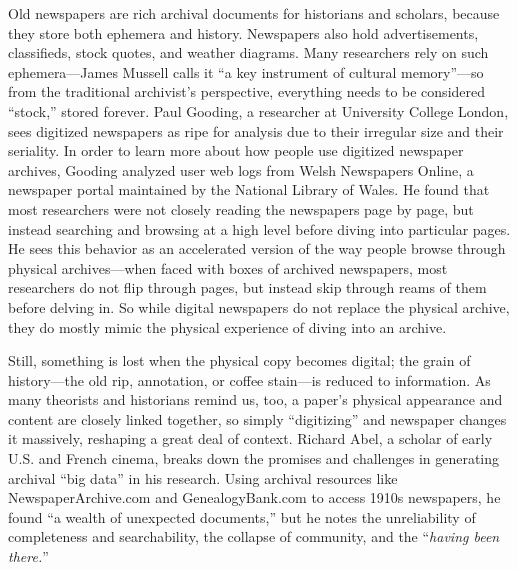Old newspapers are rich archival documents for historians and scholars, because they store both ephemera and history. Newspapers also hold advertisements, classifieds, stock quotes, and weather diagrams. Many researchers rely on such ephemera---James Mussell calls it ``a key instrument of cultural memory''---so from the traditional archivist's perspective, everything needs to be considered ``stock,'' stored forever.\autocite{mussell_passing_2012} Paul Gooding, a researcher at University College London, sees digitized newspapers as ripe for analysis due to their irregular size and their seriality.\autocite{gooding_exploring_2014} In order to learn more about how people use digitized newspaper archives, Gooding analyzed user web logs from Welsh Newspapers Online, a newspaper portal maintained by the National Library of Wales. He found that most researchers were not closely reading the newspapers page by page, but instead searching and browsing at a high level before diving into particular pages. He sees this behavior as an accelerated version of the way people browse through physical archives---when faced with boxes of archived newspapers, most researchers do not flip through pages, but instead skip through reams of them before delving in. So while digital newspapers do not replace the physical archive, they do mostly mimic the physical experience of diving into an archive.

Still, something is lost when the physical copy becomes digital; the grain of history---the old rip, annotation, or coffee stain---is reduced to information.  As many theorists and historians remind us, too, a paper's physical appearance and content are closely linked together, so simply ``digitizing'' and newspaper changes it massively, reshaping a great deal of context.\autocite[388-389]{mussell_elemental_2014,manoff_archive_2010} Richard Abel, a scholar of early U.S. and French cinema, breaks down the promises and challenges in generating archival ``big data'' in his research. Using archival resources like NewspaperArchive.com and GenealogyBank.com to access 1910s newspapers, he found ``a wealth of unexpected documents,'' but he notes the unreliability of completeness and searchability, the collapse of community, and the ``\emph{having been there.}''\autocite[6]{abel_pleasures_2013}

